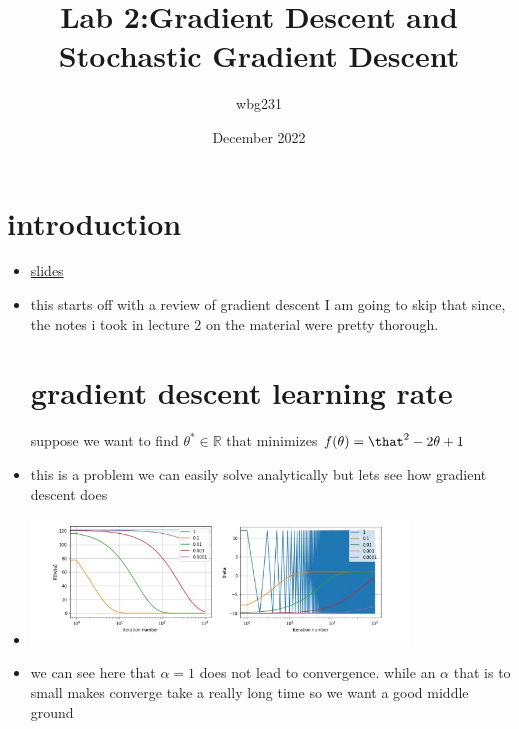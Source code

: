 \documentclass{article}
\title{Lab 2:Gradient Descent and Stochastic Gradient Descent}
\author{wbg231 }
\date{December 2022}
\begin{document}
\maketitle

\section{introduction}
\begin{itemize}
\item \href{https://nyu-ds1003.github.io/mlcourse/2023/labs/Lab2.pdf}{slides} 
\item this starts off with a review of gradient descent I am going to skip that since, the notes i took in lecture 2 on the material were pretty thorough. 
\section{gradient descent learning rate}
\itme suppose we want to find $\theta^{*}\in \mathbb{R}$ that minimizes $f(\theta)=\that^2-2\theta+1$
\item this is a problem we can easily solve analytically but lets see how gradient descent does 
\item \includegraphics[width=10cm]{labs/lab_2/immages/lab_2_1.jpg}
\item we can see here that $\alpha=1$ does not lead to convergence. 
\itme while an $\alpha$ that is to small makes converge take a really long time so we want a good middle ground 

\end{itemize}
\end{document}
